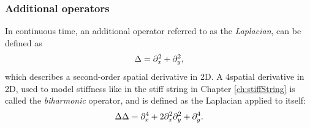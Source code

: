 \subsubsection{Additional operators}
In continuous time, an additional operator referred to as the \textit{Laplacian}, can be defined as
\begin{equation}\label{eq:laplacian}
    \Delta = \partial_x^2 + \partial_y^2,
\end{equation}
which describes a second-order spatial derivative in 2D. A 4\thOrder spatial derivative in 2D, used to model stiffness like in the stiff string in Chapter \ref{ch:stiffString} is called the \textit{biharmonic} operator, and is defined as the Laplacian applied to itself:
\begin{equation}\label{eq:biharmonic}
    \Delta\Delta = \partial_x^4 + 2\partial_x^2\partial_y^2 +  \partial_y^4.
\end{equation}


